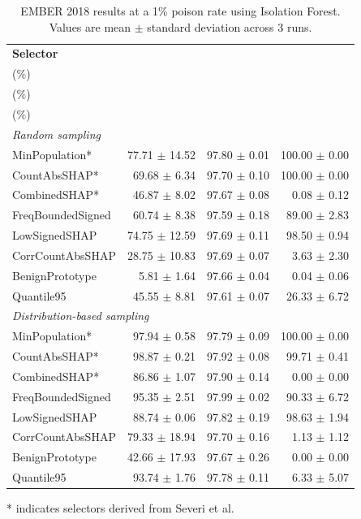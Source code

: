 \begin{table}[!t]
    \centering
    \caption{EMBER 2018 results at a 1\% poison rate using Isolation Forest. Values are mean $\pm$ standard deviation across 3 runs.}
    \label{tab:ember2018_1p_if}
    \setlength{\tabcolsep}{3.0pt}
    \renewcommand{\arraystretch}{1.08}
    \begin{tabular}{lrrr}
        \toprule
        \textbf{Selector} &
        \makecell{\textbf{ASR}\\($\%$)} &
        \makecell{\textbf{Clean accuracy}\\($\%$)} &
        \makecell{\textbf{Poison recall}\\($\%$)} \\
        \midrule
        \multicolumn{4}{l}{\textit{Random sampling}} \\
        MinPopulation*      & 77.71 $\pm$ 14.52 & 97.80 $\pm$ 0.01 & 100.00 $\pm$ 0.00 \\
        CountAbsSHAP*       & 69.68 $\pm$ 6.34  & 97.70 $\pm$ 0.10 & 100.00 $\pm$ 0.00 \\
        CombinedSHAP*       & 46.87 $\pm$ 8.02  & 97.67 $\pm$ 0.08 & 0.08 $\pm$ 0.12 \\
        FreqBoundedSigned   & 60.74 $\pm$ 8.38  & 97.59 $\pm$ 0.18 & 89.00 $\pm$ 2.83 \\
        LowSignedSHAP       & 74.75 $\pm$ 12.59 & 97.69 $\pm$ 0.11 & 98.50 $\pm$ 0.94 \\
        CorrCountAbsSHAP    & 28.75 $\pm$ 10.83 & 97.69 $\pm$ 0.07 & 3.63 $\pm$ 2.30 \\
        BenignPrototype     & 5.81 $\pm$ 1.64  & 97.66 $\pm$ 0.04 & 0.04 $\pm$ 0.06 \\
        Quantile95          & 45.55 $\pm$ 8.81  & 97.61 $\pm$ 0.07 & 26.33 $\pm$ 6.72 \\
        \midrule
        \multicolumn{4}{l}{\textit{Distribution-based sampling}} \\
        MinPopulation*      & 97.94 $\pm$ 0.58 & 97.79 $\pm$ 0.09 & 100.00 $\pm$ 0.00 \\
        CountAbsSHAP*       & 98.87 $\pm$ 0.21 & 97.92 $\pm$ 0.08 & 99.71 $\pm$ 0.41 \\
        CombinedSHAP*       & 86.86 $\pm$ 1.07 & 97.90 $\pm$ 0.14 & 0.00 $\pm$ 0.00 \\
        FreqBoundedSigned   & 95.35 $\pm$ 2.51 & 97.99 $\pm$ 0.02 & 90.33 $\pm$ 6.72 \\
        LowSignedSHAP       & 88.74 $\pm$ 0.06 & 97.82 $\pm$ 0.19 & 98.63 $\pm$ 1.94 \\
        CorrCountAbsSHAP    & 79.33 $\pm$ 18.94 & 97.70 $\pm$ 0.16 & 1.13 $\pm$ 1.12 \\
        BenignPrototype     & 42.66 $\pm$ 17.93 & 97.67 $\pm$ 0.26 & 0.00 $\pm$ 0.00 \\
        Quantile95          & 93.74 $\pm$ 1.76 & 97.78 $\pm$ 0.11 & 6.33 $\pm$ 5.07 \\
        \bottomrule
    \end{tabular}
    \vspace{0.5mm}
    \raggedright
    * indicates selectors derived from Severi et al.
\end{table}
